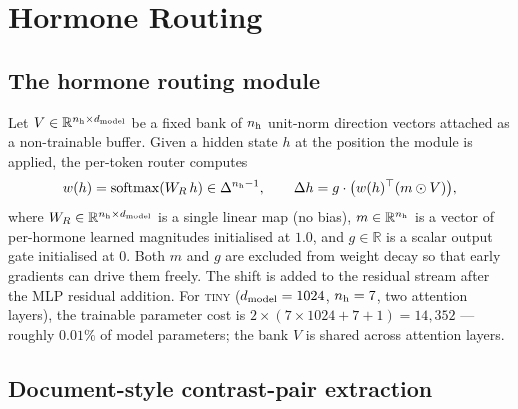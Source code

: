 \section{Hormone Routing}
\label{sec:hormone}

\subsection{The hormone routing module}

Let $V \in \mathbb{R}^{n_{\text{h}} \times d_{\text{model}}}$ be a fixed bank of $n_{\text{h}}$ unit-norm direction vectors attached as a non-trainable buffer. Given a hidden state $h$ at the position the module is applied, the per-token router computes
\begin{equation}
w(h) = \mathrm{softmax}(W_R\, h) \in \Delta^{n_{\text{h}} - 1}, \qquad
\Delta h = g \cdot \big(w(h)^\top (m \odot V)\big),
\end{equation}
where $W_R \in \mathbb{R}^{n_{\text{h}} \times d_{\text{model}}}$ is a single linear map (no bias), $m \in \mathbb{R}^{n_{\text{h}}}$ is a vector of per-hormone learned magnitudes initialised at $1.0$, and $g \in \mathbb{R}$ is a scalar output gate initialised at $0$. Both $m$ and $g$ are excluded from weight decay so that early gradients can drive them freely. The shift is added to the residual stream after the MLP residual addition. For \textsc{tiny} ($d_{\text{model}} = 1024$, $n_{\text{h}} = 7$, two attention layers), the trainable parameter cost is $2 \times (7 \times 1024 + 7 + 1) = 14{,}352$ --- roughly $0.01\%$ of model parameters; the bank $V$ is shared across attention layers.

\subsection{Document-style contrast-pair extraction}
\label{subsec:extraction}

